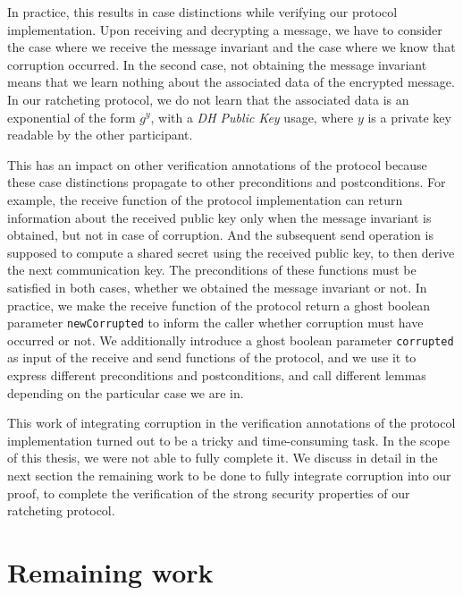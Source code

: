 In practice, this results in case distinctions while verifying our protocol implementation.
Upon receiving and decrypting a message, we have to consider the case where we receive the message invariant and the case where we know that corruption occurred.
In the second case, not obtaining the message invariant means that we learn nothing about the associated data of the encrypted message. In our ratcheting protocol, we do not learn that the associated data is an exponential of the form $g^y$, with a \emph{DH Public Key} usage, where $y$ is a private key readable by the other participant.

This has an impact on other verification annotations of the protocol because these case distinctions propagate to other preconditions and postconditions.
For example, the receive function of the protocol implementation can return information about the received public key only when the message invariant is obtained, but not in case of corruption.
And the subsequent send operation is supposed to compute a shared secret using the received public key, to then derive the next communication key.
The preconditions of these functions must be satisfied in both cases, whether we obtained the message invariant or not.
In practice, we make the receive function of the protocol return a ghost boolean parameter \texttt{newCorrupted} to inform the caller whether corruption must have occurred or not.
We additionally introduce a ghost boolean parameter \texttt{corrupted} as input of the receive and send functions of the protocol, and we use it to express different preconditions and postconditions, and call different lemmas depending on the particular case we are in.

This work of integrating corruption in the verification annotations of the protocol implementation turned out to be a tricky and time-consuming task.
In the scope of this thesis, we were not able to fully complete it.
We discuss in detail in the next section the remaining work to be done to fully integrate corruption into our proof, to complete the verification of the strong security properties of our ratcheting protocol.

\section{Remaining work}
\label{sec:remaining-work}

